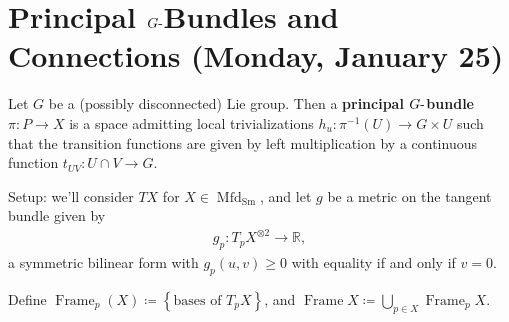 \hypertarget{principal-ghbox-bundles-and-connections-monday-january-25}{%
\section{\texorpdfstring{Principal \(G{\hbox{-}}\)Bundles and
Connections (Monday, January
25)}{Principal G\{\textbackslash hbox\{-\}\}Bundles and Connections (Monday, January 25)}}\label{principal-ghbox-bundles-and-connections-monday-january-25}}

\begin{definition}

Let \(G\) be a (possibly disconnected) Lie group. Then a
\textbf{principal \(G{\hbox{-}}\)bundle} \(\pi:P\to X\) is a space
admitting local trivializations \(h_u: \pi ^{-1} (U) \to G \times U\)
such that the transition functions are given by left multiplication by a
continuous function \(t_{UV}: U \cap V \to G\).

\begin{figure}
\centering
{}
\end{figure}

\end{definition}

\begin{remark}

Setup: we'll consider \(TX\) for
\(X\in {\operatorname{Mfd}}_{\operatorname{Sm}}\), and let \(g\) be a
metric on the tangent bundle given by
\begin{align*}
g_p: T_pX^{\otimes 2} \to {\mathbb{R}}
,\end{align*}
a symmetric bilinear form with \(g_p(u, v) \geq 0\) with equality if and
only if \(v=0\).

\end{remark}

\begin{definition}

Define
\({\operatorname{Frame}}_p(X) \coloneqq\left\{{\text{bases of } T_p X}\right\}\),
and
\({\operatorname{Frame}}X \coloneqq\bigcup_{p\in X} {\operatorname{Frame}}_p X\).

\end{definition}

